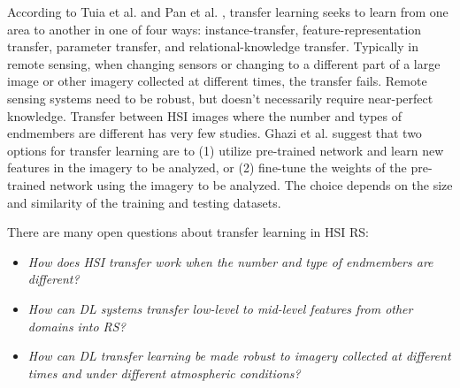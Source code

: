 \documentclass[12pt]{spieman}
\begin{document}
\begin{spacing}{1}
According to Tuia et al. \cite{tuia2016domain} and Pan et al. \cite{pan2010survey} , transfer learning seeks to learn from one area to another in one of four ways: instance-transfer, feature-representation transfer, parameter transfer, and relational-knowledge transfer. Typically in remote sensing, when changing sensors or changing to a different part of a large image or other imagery collected at different times, the transfer fails. Remote sensing systems need to be robust, but doesn't necessarily require near-perfect knowledge. Transfer between HSI images where the number and types of endmembers are different has very few studies. Ghazi et al. \cite{ghazi2017plant} suggest that two options for transfer learning are to (1) utilize pre-trained network and learn new features in the imagery to be analyzed, or (2) fine-tune the weights of the pre-trained network using the imagery to be analyzed. The choice depends on the size and similarity of the training and testing datasets.

There are many open questions about transfer learning in HSI RS:
\begin{itemize}
    \setlength{\parskip}{0pt}
    \setlength{\itemsep}{0pt plus 1pt}
    \item \textit{How does HSI transfer work when the number and type of endmembers are different?}
    \item \textit{How can DL systems transfer low-level to mid-level features from other domains into RS?}
    \item \textit{How can DL transfer learning be made robust to imagery collected at different times and under different atmospheric conditions?}
\end{itemize}


\end{spacing}
\end{document}
